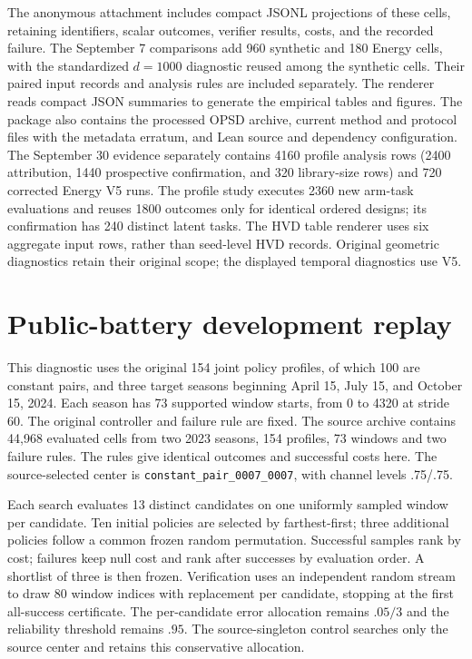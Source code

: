 The anonymous attachment includes compact JSONL projections of these cells,
retaining identifiers, scalar outcomes, verifier results, costs, and the
recorded failure.  The September 7 comparisons add 960 synthetic and 180 Energy
cells, with the standardized $d=1000$ diagnostic reused among the synthetic
cells.  Their paired input records and analysis rules are included separately.
The renderer reads compact JSON summaries to generate the empirical tables
and figures.  The package also contains the processed OPSD archive, current
method and protocol files with the metadata erratum, and Lean source and
dependency configuration.  The September 30 evidence separately contains
4160 profile analysis rows (2400 attribution, 1440 prospective confirmation,
and 320 library-size rows) and 720 corrected Energy V5 runs.  The profile study
executes 2360 new arm-task evaluations and reuses 1800 outcomes only for
identical ordered designs; its confirmation has 240 distinct latent tasks.
The HVD table renderer uses six aggregate input rows, rather than seed-level
HVD records.  Original geometric diagnostics retain their original scope;
the displayed temporal diagnostics use V5.


\section{Public-battery development replay}\label{ec:public-battery}

This diagnostic uses the original 154 joint policy profiles, of which 100
are constant pairs, and three target seasons beginning April 15, July 15,
and October 15, 2024.  Each season has 73 supported window starts, from 0 to
4320 at stride 60.  The original controller and failure rule are fixed.
The source archive contains 44,968 evaluated cells from two 2023 seasons,
154 profiles, 73 windows and two failure rules.  The rules give identical
outcomes and successful costs here.  The source-selected center is
\texttt{constant\_pair\_0007\_0007}, with channel levels .75/.75.

Each search evaluates 13 distinct candidates on one uniformly sampled window
per candidate.  Ten initial policies are selected by farthest-first;
three additional policies follow a common frozen random permutation.
Successful samples rank by cost; failures keep null cost and rank after
successes by evaluation order.  A shortlist of three is then frozen.
Verification uses an independent random stream to draw 80 window indices
with replacement per candidate, stopping at the first all-success
certificate.  The per-candidate error allocation remains $.05/3$ and the
reliability threshold remains $.95$.  The source-singleton control searches
only the source center and retains this conservative allocation.

